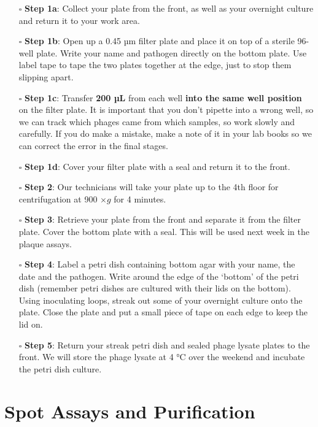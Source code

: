 \documentclass[
]{book}
\providecommand{\tightlist}{%
  \setlength{\itemsep}{0pt}\setlength{\parskip}{0pt}}
\begin{document}
\begin{itemize}
\tightlist
\item[$\square$]
  \textbf{Step 1a}: Collect your plate from the front, as well as your overnight culture and return it to your work area.
\item[$\square$]
  \textbf{Step 1b}: Open up a 0.45 µm filter plate and place it on top of a sterile 96-well plate. Write your name and pathogen directly on the bottom plate. Use label tape to tape the two plates together at the edge, just to stop them slipping apart.
\item[$\square$]
  \textbf{Step 1c}: Transfer \textbf{200 µL} from each well \textbf{into the same well position} on the filter plate. It is important that you don't pipette into a wrong well, so we can track which phages came from which samples, so work slowly and carefully. If you do make a mistake, make a note of it in your lab books so we can correct the error in the final stages.
\item[$\square$]
  \textbf{Step 1d}: Cover your filter plate with a seal and return it to the front.
\item[$\square$]
  \textbf{Step 2}: Our technicians will take your plate up to the 4th floor for centrifugation at 900 \(\times g\) for 4 minutes.
\item[$\square$]
  \textbf{Step 3}: Retrieve your plate from the front and separate it from the filter plate. Cover the bottom plate with a seal. This will be used next week in the plaque assays.
\item[$\square$]
  \textbf{Step 4}: Label a petri dish containing bottom agar with your name, the date and the pathogen. Write around the edge of the `bottom' of the petri dish (remember petri dishes are cultured with their lids on the bottom). Using inoculating loops, streak out some of your overnight culture onto the plate. Close the plate and put a small piece of tape on each edge to keep the lid on.
\item[$\square$]
  \textbf{Step 5}: Return your streak petri dish and sealed phage lysate plates to the front. We will store the phage lysate at 4 °C over the weekend and incubate the petri dish culture.
\end{itemize}

\hypertarget{spot-assays-and-purification}{%
\chapter{Spot Assays and Purification}\label{spot-assays-and-purification}}
\end{document}
